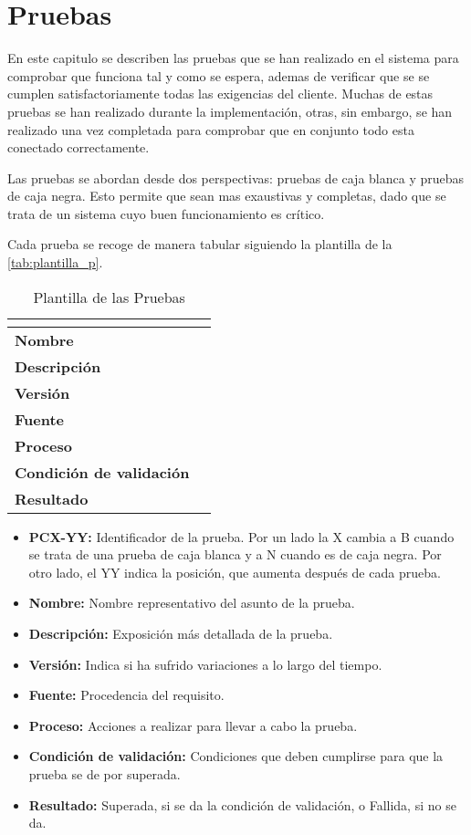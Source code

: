 \chapter{Pruebas}
\label{ch:pruebas}
En este capitulo se describen las pruebas que se han realizado en el sistema para comprobar que funciona tal y como se espera, ademas de verificar que se se cumplen satisfactoriamente todas las exigencias del cliente. Muchas de estas pruebas se han realizado durante la implementación, otras, sin embargo, se han realizado una vez completada para comprobar que en conjunto todo esta conectado correctamente. 

Las pruebas se abordan desde dos perspectivas: pruebas de caja blanca y pruebas de caja negra. Esto permite que sean mas exaustivas y completas, dado que se trata de un sistema cuyo buen funcionamiento es crítico. 

Cada prueba se recoge de manera tabular siguiendo la plantilla de la \autoref{tab:plantilla_p}.
\begin{table}[H]
	\centering
	\caption{Plantilla de las Pruebas}
	\label{tab:plantilla_p}
	\begin{tabular}{|l|p{}|}
		\hline
		\multicolumn{2}{|c|}{\cellcolor[HTML]{BFBFBF}{\color[HTML]{000000} \textbf{PCX-YY}}} \\ \hline
		\textbf{Nombre}                  &   \\ \hline
		\textbf{Descripción}             &   \\ \hline
		\textbf{Versión}                 &   \\ \hline
		\textbf{Fuente}                  &   \\ \hline
		\textbf{Proceso}                 &   \\ \hline
		\textbf{Condición de validación} &   \\ \hline
		\textbf{Resultado}               &   \\ \hline
	\end{tabular}
\end{table}
\begin{itemize}
	\item \textbf{PCX-YY:} Identificador de la prueba. Por un lado la X cambia a B cuando se trata de una prueba de caja blanca y a N cuando es de caja negra. Por otro lado, el YY indica la posición, que aumenta después de cada prueba.
	\item \textbf{Nombre:} Nombre representativo del asunto de la prueba.
	\item \textbf{Descripción:} Exposición más detallada de la prueba.
	\item \textbf{Versión:} Indica si ha sufrido variaciones a lo largo del tiempo.
	\item \textbf{Fuente:} Procedencia del requisito.
	\item \textbf{Proceso:} Acciones a realizar para llevar a cabo la prueba.
	\item \textbf{Condición de validación:} Condiciones que deben cumplirse para que la prueba se de por superada.
	\item \textbf{Resultado:} Superada, si se da la condición de validación, o Fallida, si no se da.
\end{itemize}

